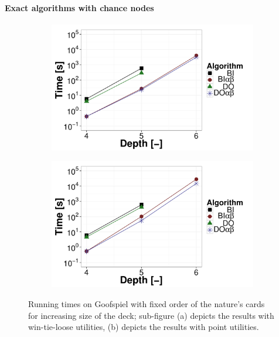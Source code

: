 \paragraph{Exact algorithms with chance nodes}

\begin{figure}[t]
\centering
	\begin{subfigure}{0.49\textwidth}
 		\includegraphics[width=1\textwidth]{figures/GS-BT-NN.pdf}\caption{}\label{fig:off:res:gsn-bt}
 	\end{subfigure}
	\begin{subfigure}{0.49\textwidth}
 		\includegraphics[width=1\textwidth]{figures/GS-BF-NN.pdf}\caption{}\label{fig:off:res:gsn-bf}
 	\end{subfigure}
\caption{Running times on Goofspiel with fixed order of the nature's cards for increasing size of the deck; sub-figure (a) depicts the results with win-tie-loose utilities, (b) depicts the results with point utilities.} \label{fig:off:res:gsn}
\end{figure}


